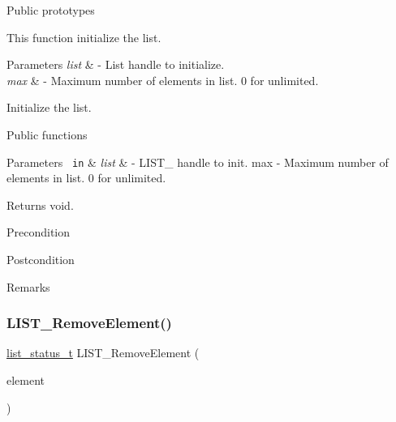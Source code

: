 Public prototypes \begin{DoxyVerb}\end{DoxyVerb}


This function initialize the list.


\begin{DoxyParams}{Parameters}
{\em list} & -\/ List handle to initialize. \\
\hline
{\em max} & -\/ Maximum number of elements in list. 0 for unlimited.\\
\hline
\end{DoxyParams}
Initialize the list.





Public functions \begin{DoxyVerb}\end{DoxyVerb}




 
\begin{DoxyParams}[1]{Parameters}
\mbox{\texttt{ in}}  & {\em list} & -\/ L\+I\+S\+T\+\_\+ handle to init. max -\/ Maximum number of elements in list. 0 for unlimited.\\
\hline
\end{DoxyParams}
\begin{DoxyReturn}{Returns}
void.
\end{DoxyReturn}
\begin{DoxyPrecond}{Precondition}

\end{DoxyPrecond}
\begin{DoxyPostcond}{Postcondition}

\end{DoxyPostcond}
\begin{DoxyRemark}{Remarks}
\begin{DoxyVerb}\end{DoxyVerb}
 
\end{DoxyRemark}
\mbox{\label{group___generic_list_gac92c4d99a64c3cef1c7c6c74b97fb93b}} 
\subsubsection{\texorpdfstring{LIST\_RemoveElement()}{LIST\_RemoveElement()}}
{\footnotesize\ttfamily \mbox{\hyperlink{group___generic_list_gaae3dc4a15b24287b8c3ac8706195aa7e}{list\+\_\+status\+\_\+t}} L\+I\+S\+T\+\_\+\+Remove\+Element (\begin{DoxyParamCaption}\item[{\mbox{\hyperlink{structlist__element__tag}{list\+\_\+element\+\_\+handle\+\_\+t}}}]{element }\end{DoxyParamCaption})}



